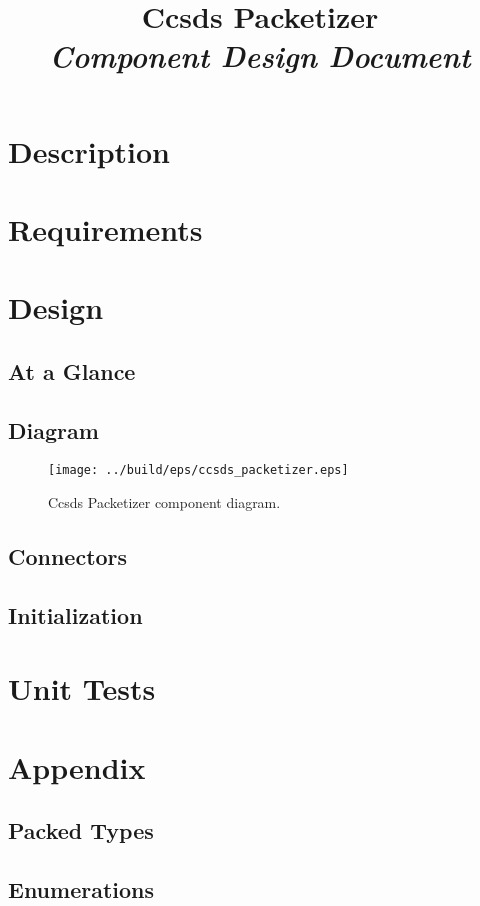 



\title{\textbf{Ccsds Packetizer} \\
\large\textit{Component Design Document}}
\date{}
\maketitle

\section{Description}


\section{Requirements}


\section{Design}

\subsection{At a Glance}


\subsection{Diagram}
\begin{figure}[H]
  \texttt{[image: ../build/eps/ccsds\_packetizer.eps]}
  \caption{Ccsds Packetizer component diagram.}
\end{figure}

\subsection{Connectors}


\subsection{Initialization}


\section{Unit Tests}



\section{Appendix}
\subsection{Packed Types}



\subsection{Enumerations}




